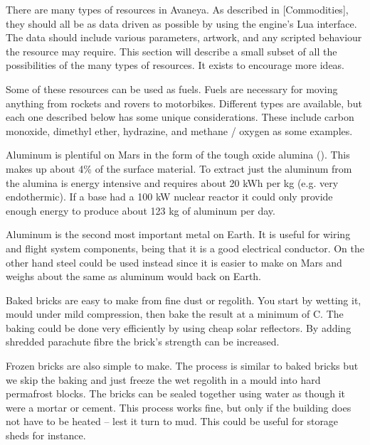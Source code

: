 

There are many types of resources in Avaneya. As described in [Commodities], they should all be as data driven as possible by using the engine’s Lua interface. The data should include various parameters, artwork, and any scripted behaviour the resource may require. This section will describe a small subset of all the possibilities of the many types of resources. It exists to encourage more ideas.

Some of these resources can be used as fuels. Fuels are necessary for moving anything from rockets and rovers to motorbikes. Different types are available, but each one described below has some unique considerations. These include carbon monoxide, dimethyl ether, hydrazine, and methane / oxygen as some examples.

Aluminum is plentiful on Mars in the form of the tough oxide alumina (). This makes up about 4\% of the surface material. To extract just the aluminum from the alumina is energy intensive and requires about 20 kWh per kg (e.g. very endothermic). If a base had a 100 kW nuclear reactor it could only provide enough energy to produce about 123 kg of aluminum per day.

Aluminum is the second most important metal on Earth. It is useful for wiring and flight system components, being that it is a good electrical conductor. On the other hand steel could be used instead since it is easier to make on Mars and weighs about the same as aluminum would back on Earth.

Baked bricks are easy to make from fine dust or regolith. You start by wetting it, mould under mild compression, then bake the result at a minimum of C. The baking could be done very efficiently by using cheap solar reflectors. By adding shredded parachute fibre the brick's strength can be increased.

Frozen bricks are also simple to make. The process is similar to baked bricks but we skip the baking and just freeze the wet regolith in a mould into hard permafrost blocks. The bricks can be sealed together using water as though it were a mortar or cement. This process works fine, but only if the building does not have to be heated -- lest it turn to mud. This could be useful for storage sheds for instance.

